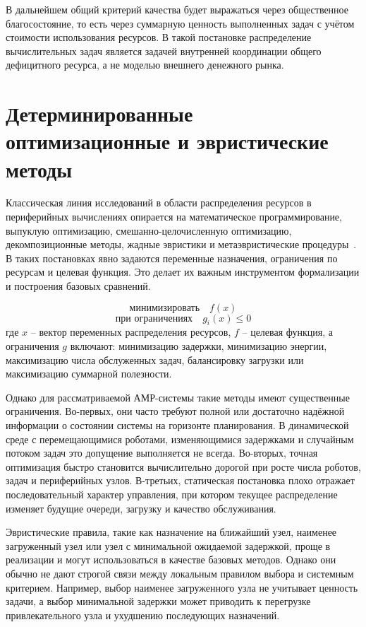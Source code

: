В дальнейшем общий критерий качества будет выражаться через общественное благосостояние, то есть через суммарную ценность выполненных задач с учётом стоимости использования ресурсов. В такой постановке распределение вычислительных задач является задачей внутренней координации общего дефицитного ресурса, а не моделью внешнего денежного рынка.

\section{Детерминированные оптимизационные и эвристические методы}

Классическая линия исследований в области распределения ресурсов в периферийных вычислениях опирается на математическое программирование, выпуклую оптимизацию, смешанно-целочисленную оптимизацию, декомпозиционные методы, жадные эвристики и метаэвристические процедуры~\cite{Mao2017MECPerspective,Mach2017MECSurvey,Luo2021ResourceScheduling,Baruffa2025AMRResourceAssignment}. В таких постановках явно задаются переменные назначения, ограничения по ресурсам и целевая функция. Это делает их важным инструментом формализации и построения базовых сравнений.

\[\text{минимизировать} \quad f(x)\]
\[\text{при ограничениях} \quad g_i(x) \leq 0\]
где $x$ -- вектор переменных распределения ресурсов, $f$ -- целевая функция, а
ограничения $g$ включают: минимизацию задержки, минимизацию энергии,
максимизацию числа обслуженных задач, балансировку загрузки или максимизацию суммарной полезности.

Однако для рассматриваемой АМР-системы такие методы имеют существенные ограничения. Во-первых, они часто требуют полной или достаточно надёжной информации о состоянии системы на горизонте планирования. В динамической среде с перемещающимися роботами, изменяющимися задержками и случайным потоком задач это допущение выполняется не всегда. Во-вторых, точная оптимизация быстро становится вычислительно дорогой при росте числа роботов, задач и периферийных узлов. В-третьих, статическая постановка плохо отражает последовательный характер управления, при котором текущее распределение изменяет будущие очереди, загрузку и качество обслуживания.

Эвристические правила, такие как назначение на ближайший узел, наименее загруженный узел или узел с минимальной ожидаемой задержкой, проще в реализации и могут использоваться в качестве базовых методов. Однако они обычно не дают строгой связи между локальным правилом выбора и системным критерием. Например, выбор наименее загруженного узла не учитывает ценность задачи, а выбор минимальной задержки может приводить к перегрузке привлекательного узла и ухудшению последующих назначений.

